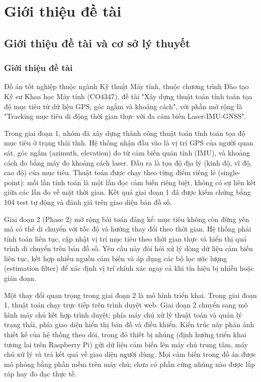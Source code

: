 \section{Giới thiệu đề tài}

\subsection{Giới thiệu đề tài và cơ sở lý thuyết}

\subsubsection{Giới thiệu đề tài}

\hspace{0.5cm} Đồ án tốt nghiệp thuộc ngành Kỹ thuật Máy tính, thuộc chương trình Đào tạo Kỹ sư Khoa học Máy tính (CO4347), đề tài "Xây dựng thuật toán tính toán tọa độ mục tiêu từ dữ liệu GPS, góc ngắm và khoảng cách", với phần mở rộng là "Tracking mục tiêu di động thời gian thực với đa cảm biến Laser-IMU-GNSS".

Trong giai đoạn 1, nhóm đã xây dựng thành công thuật toán tính toán tọa độ mục tiêu ở trạng thái tĩnh. Hệ thống nhận đầu vào là vị trí GPS của người quan sát, góc ngắm (azimuth, elevation) đo từ cảm biến quán tính (IMU), và khoảng cách đo bằng máy đo khoảng cách laser. Đầu ra là tọa độ địa lý (kinh độ, vĩ độ, cao độ) của mục tiêu. Thuật toán được chạy theo từng điểm riêng lẻ (single-point): mỗi lần tính toán là một lần đọc cảm biến riêng biệt, không có sự liên kết giữa các lần đo về mặt thời gian. Kết quả giai đoạn 1 đã được kiểm chứng bằng 104 test tự động và đánh giá trên giao diện bản đồ số.

Giai đoạn 2 (Phase 2) mở rộng bài toán đáng kể: mục tiêu không còn đứng yên mà có thể di chuyển với tốc độ và hướng thay đổi theo thời gian. Hệ thống phải tính toán liên tục, cập nhật vị trí mục tiêu theo thời gian thực và hiển thị quá trình di chuyển trên bản đồ số. Yêu cầu này đòi hỏi xử lý dòng dữ liệu cảm biến liên tục, kết hợp nhiều nguồn cảm biến và áp dụng các bộ lọc ước lượng (estimation filter) để xác định vị trí chính xác ngay cả khi tín hiệu bị nhiễu hoặc gián đoạn.

Một thay đổi quan trọng trong giai đoạn 2 là mô hình triển khai. Trong giai đoạn 1, thuật toán chạy trực tiếp trên trình duyệt web. Giai đoạn 2 chuyển sang mô hình máy chủ kết hợp trình duyệt: phía máy chủ xử lý thuật toán và quản lý trạng thái, phía giao diện hiển thị bản đồ và điều khiển. Kiến trúc này phản ánh thiết kế của hệ thống theo dõi, trong đó thiết bị nhúng (định hướng triển khai tương lai trên Raspberry Pi) gửi dữ liệu cảm biến lên máy chủ trung tâm, máy chủ xử lý và trả kết quả về giao diện người dùng. Mọi cảm biến trong đồ án được mô phỏng bằng phần mềm trên máy chủ; chưa có phần cứng nhúng nào được lắp ráp hay đo đạc thực tế.

